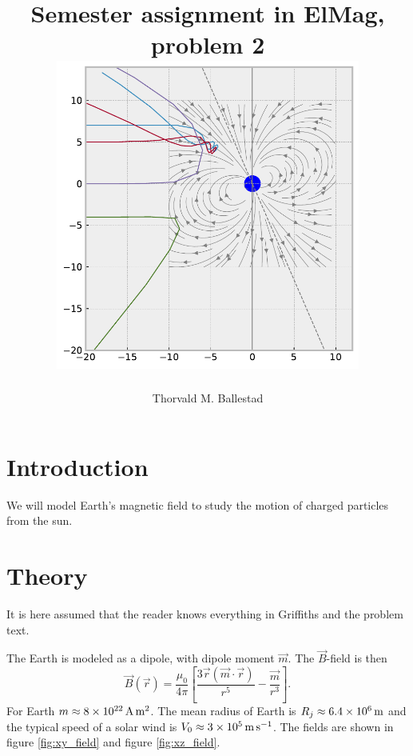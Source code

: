 \documentclass[a4paper, 12pt]{article}
\title{Semester assignment in ElMag, problem 2\\
  \centering\includegraphics[width=10cm]{media/front_image}}
\author{Thorvald M. Ballestad}
\begin{document}
\maketitle
\section{Introduction}
We will model Earth's magnetic field to study the motion of charged particles from the sun.

\section{Theory}
It is here assumed that the reader knows everything in Griffiths and the problem text.

The Earth is modeled as a dipole, with dipole moment $\vec{m}$. The $\vec{B}$-field is then
\begin{equation}\label{eq:bfield}
\vec{B}(\vec{r}) = \frac{\mu_0}{4\pi}
\left[
  \frac{3\vec{r}(\vec{m}\cdot \vec{r})}{r^5} - \frac{\vec{m}}{r^3}
  \right].
\end{equation}
For Earth $m \approx \SI{8E22}{\ampere\meter\squared}$.
The mean radius of Earth is $R_j \approx \SI{6.4E6}{\meter}$ and the typical speed of a solar wind is $V_0 \approx \SI{3E5}{\meter\per\second}$.
The fields are shown in figure \ref{fig:xy_field} and figure \ref{fig:xz_field}.
\end{document}
